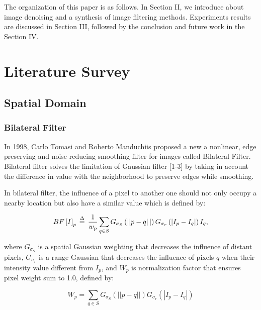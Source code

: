 The organization of this paper is as follows. In Section II, we introduce about image denoising and a synthesis of image filtering methods. Experiments results are discussed in Section III, followed by the conclusion and future work in the Section IV.

\section{Literature Survey}
\subsection{Spatial Domain}
\subsubsection{Bilateral Filter}
In 1998, Carlo Tomasi and Roberto Manduchiis \cite{Tomasi1998} proposed a new a nonlinear, edge preserving and noise-reducing smoothing filter for images called Bilateral Filter. Bilateral filter \cite{Paris2008} solves the limitation of Gaussian filter [1-3] by taking in account the difference in value with the neighborhood to preserve edges while smoothing.  

In bilateral filter, the influence of a pixel to another one should not only occupy a nearby location but also have a similar value which is defined by: 

\begin{equation}\label{eq: eq1_bf}
BF\left [ I \right ]_{p}\,\buildrel \Delta \over = \,\frac{1}{w_{p}}\sum_{q \in S}{G_{\sigma _{S}}\left (\left || p-q \right || \right ) G_{\sigma_{r}}}\left ( \left | I_{p}-I_{q} \right | \right )I_{q},
\end{equation}

where $G_{\sigma_{S}}$ is a spatial Gaussian weighting that decreases the influence of distant pixels, $G_{\sigma_{r}}$ is a range Gaussian that decreases the influence of pixels $q$ when their intensity value different from $I_{p}$, and $W_{p}$ is normalization factor that ensures pixel weight sum to 1.0, defined by: 

\begin{equation}\label{eq: eq1_bf_wp}
W_{p}=\sum_{q \in S}{G_{\sigma _{S}}\left (\left || p-q \right || \right ) G_{\sigma_{r}}}\left ( \left | I_{p}-I_{q} \right | \right )
\end{equation}

